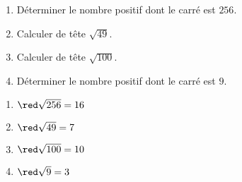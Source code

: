 \begin{exercice*}
    \begin{enumerate}
        \item Déterminer le nombre positif dont le carré est $256$.
        \item Calculer de tête $\sqrt{49}$.
        \item Calculer de tête $\sqrt{100}$.
        \item Déterminer le nombre positif dont le carré est $9$.
    \end{enumerate}
\end{exercice*}
\begin{corrige}
    \begin{enumerate}
        \item ${\red\sqrt{256}=16}$
        \item ${\red\sqrt{49}=7}$
        \item ${\red\sqrt{100}=10}$
        \item ${\red\sqrt{9}=3}$
    \end{enumerate}
\end{corrige}

